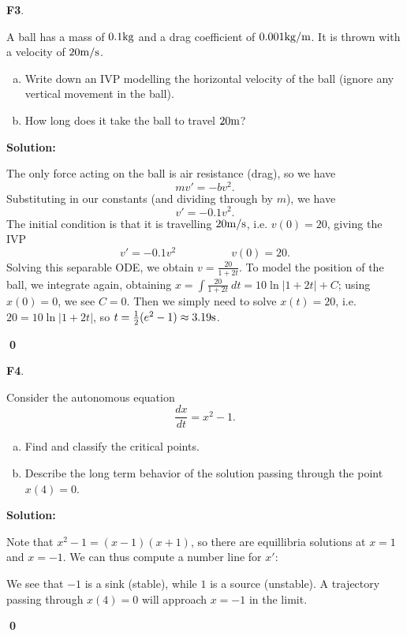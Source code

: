 \documentclass{article}
\newenvironment{problem}[1]
{
  \begin{flushleft}
  \textbf{#1}.
  \ignorespaces
}
{
  \end{flushleft}
}
\newenvironment{solution}
{
  \ignorespaces
  \textbf{Solution:}
}
{
  \ignorespacesafterend
  \begin{flushright}
  {\bfseries \qed}
  \end{flushright}
}
\begin{document}
\begin{problem}{F3}
A ball has a mass of \(0.1 {\rm kg}\) and a drag coefficient of \(0.001 {\rm kg/m}\).  It is thrown with a velocity of \(20 {\rm m/s}\). 
\begin{enumerate}[(a)]
\item Write down an IVP modelling the horizontal velocity of the ball (ignore any vertical movement in the ball).
\item How long does it take the ball to travel \(20 {\rm m}\)?
\end{enumerate}
\end{problem}
\begin{solution}
The only force acting on the ball is air resistance (drag), so we have
\[mv'=-bv^2.\]
Substituting in our constants (and dividing through by \(m\)), we have
\[v'=- 0.1v^2 .\]
The initial condition is that it is travelling \(20 {\rm m/s}\), i.e. \(v(0)=20\), giving the IVP 
\[v'=- 0.1v^2 \hspace{5em} v(0)=20.\]
Solving this separable ODE, we obtain \(v=\frac{20}{1+2t}\).  To model the position of the ball, we integrate again, obtaining \(x=\int \frac{20}{1+2t}\ dt = 10 \ln |1+2t| +C\); using \(x(0)=0\), we see \(C=0\).  Then we simply need to solve \(x(t)=20\), i.e. \(20=10\ln|1+2t|\), so \(t=\frac{1}{2}(e^2-1) \approx 3.19 {\rm s}\).
\end{solution}



\begin{problem}{F4}
Consider the autonomous equation 
\[\frac{dx}{dt} = x^2-1.\]  
\begin{enumerate}[(a)]
\item Find and classify the critical points.
\item Describe the long term behavior of the solution passing through the point \( x(4)=0 \).
\end{enumerate}
\end{problem}
\begin{solution}

Note that \(x^2-1=(x-1)(x+1)\), so there are equillibria solutions at \(x=1\) and \(x=-1\).  We can thus compute a number line for \(x'\):

\begin{center}
\end{center}

We see that \(-1\) is a sink (stable), while \(1\) is a source (unstable).  A trajectory passing through \(x(4)=0\) will approach \(x=-1\) in the limit.
\end{solution}
\end{document}
